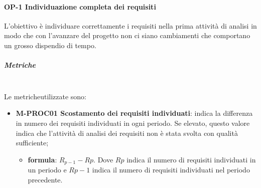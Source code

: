 		\paragraph{OP-1 Individuazione completa dei requisiti}
		L'obiettivo è individuare correttamente i requisiti nella prima attività di analisi in modo che con l'avanzare del progetto non ci siano cambiamenti che comportano un grosso dispendio di tempo.
		\subparagraph{Metriche}\mbox{}\\ [1mm]
		Le metriche\glosp utilizzate sono:
		\begin{itemize}
			\item \textbf{M-PROC01 Scostamento dei requisiti individuati}: indica la differenza in numero dei requisiti individuati in ogni periodo. Se elevato, questo valore indica che l'attività di analisi dei requisiti non è stata svolta con qualità sufficiente;
			\begin{itemize}
				\item[] \textbf{formula}: $R_{p-1}-R{p}$. Dove $R{p}$ indica il numero di requisiti individuati in un periodo e $R{p-1}$ indica il numero di requisiti individuati nel periodo precedente.
			\end{itemize} 
		\end{itemize}		

